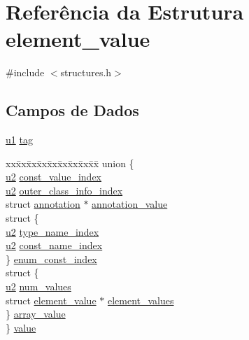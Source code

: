 \hypertarget{structelement__value}{}\section{Referência da Estrutura element\+\_\+value}
\label{structelement__value}


{\ttfamily \#include $<$structures.\+h$>$}

\subsection*{Campos de Dados}
\begin{DoxyCompactItemize}
\item 
\hyperlink{lista__operandos_8h_ad9f4cdb6757615aae2fad89dab3c5470}{u1} \hyperlink{structelement__value_a2664460cf3cbd50f7116dcc6fc5dc049}{tag}
\item 
\begin{tabbing}
xx\=xx\=xx\=xx\=xx\=xx\=xx\=xx\=xx\=\kill
union \{\\
\>\hyperlink{lista__operandos_8h_a732cde1300aafb73b0ea6c2558a7a54f}{u2} \hyperlink{structelement__value_a8ba1271c398c892dcfc93197244c1a50}{const\_value\_index}\\
\>\hyperlink{lista__operandos_8h_a732cde1300aafb73b0ea6c2558a7a54f}{u2} \hyperlink{structelement__value_a194379118d41c95cec886acb9c4b9d02}{outer\_class\_info\_index}\\
\>struct \hyperlink{structannotation}{annotation} $\ast$ \hyperlink{structelement__value_af583fbf558e5dd08ffee4323d7f86fe9}{annotation\_value}\\
\>struct \{\\
\>\>\hyperlink{lista__operandos_8h_a732cde1300aafb73b0ea6c2558a7a54f}{u2} \hyperlink{structelement__value_ad1925807cc4b5a79fa7fa56d46462ecb}{type\_name\_index}\\
\>\>\hyperlink{lista__operandos_8h_a732cde1300aafb73b0ea6c2558a7a54f}{u2} \hyperlink{structelement__value_a44ed4ad39e3d38535f06cd844a86ad80}{const\_name\_index}\\
\>\} \hyperlink{structelement__value_ae8482fa795543c28cfff6de025bfe5a0}{enum\_const\_index}\\
\>struct \{\\
\>\>\hyperlink{lista__operandos_8h_a732cde1300aafb73b0ea6c2558a7a54f}{u2} \hyperlink{structelement__value_adcb3c2aa2aeef9f3c78b25162e99274e}{num\_values}\\
\>\>struct \hyperlink{structelement__value}{element\_value} $\ast$ \hyperlink{structelement__value_a1bb47f79171a2bd7a6efb5d5b4882c49}{element\_values}\\
\>\} \hyperlink{structelement__value_a97368440bfd85de2d3508ac9fdea93ff}{array\_value}\\
\} \hyperlink{structelement__value_a4e0b4dd7c57280a3c485e3f5d03bee80}{value}\\

\end{tabbing}\end{DoxyCompactItemize}



